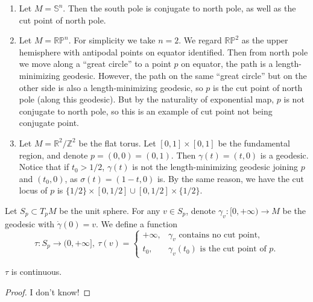 \begin{eg}\label{eg of cut loci}
    \begin{enumerate}[(1)]
        \item Let $M=\mathbb{S}^n$.
        Then the south pole is conjugate to north pole, as well as the cut point of north pole.
        \item Let $M=\mathbb{RP}^n$.
        For simplicity we take $n=2$.
        We regard $\mathbb{RP}^2$ as the upper hemisphere with antipodal points on equator identified.
        Then from north pole we move along a ``great circle'' to a point $p$ on equator, the path is a length-minimizing geodesic.
        However, the path on the same ``great circle'' but on the other side is also a length-minimizing geodesic, so $p$ is the cut point of north pole (along this geodesic).
        But by the naturality of exponential map, $p$ is not conjugate to north pole, so this is an example of cut point not being conjugate point.
        \item Let $M=\mathbb{R}^2/\mathbb{Z}^2$ be the flat torus.
        Let $[0,1]\times[0,1]$ be the fundamental region, and denote $p=(0,0)=(0,1)$.
        Then $\gamma(t)=(t,0)$ is a geodesic.
        Notice that if $t_0>1/2$, $\gamma(t)$ is not the length-minimizing geodesic joining $p$ and $(t_0,0)$, as $\sigma(t)=(1-t,0)$ is.
        By the same reason, we have the cut locus of $p$ is $\{1/2\}\times[0,1/2]\cup[0,1/2]\times\{1/2\}$.
    \end{enumerate}
\end{eg}

Let $S_p\subset T_pM$ be the unit sphere.
For any $v\in S_p$, denote $\gamma_v:[0,+\infty)\to M$ be the geodesic with $\dot\gamma(0)=v$.
We define a function
\[\tau:S_p\to(0,+\infty],\ \tau(v)=\begin{cases}
    +\infty, & \gamma_v\text{ contains no cut point},\\
    t_0, & \gamma_v(t_0)\text{ is the cut point of }p.
\end{cases}\]

\begin{prop}
    $\tau$ is continuous.
\end{prop}
\begin{proof}
    I don't know!
\end{proof}
